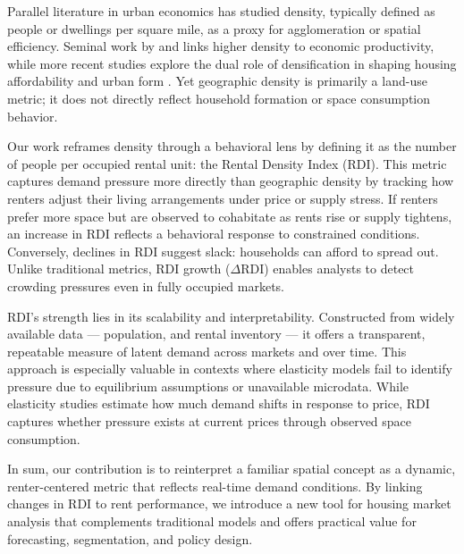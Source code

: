 \documentclass[APA,Times1COL]{WileyNJDv5} %
\begin{document}
Parallel literature in urban economics has studied density, typically defined as people or dwellings per square mile, as a proxy for agglomeration or spatial efficiency. Seminal work by \cite{glaeser2001cities} and \cite{duranton2004micro} links higher density to economic productivity, while more recent studies explore the dual role of densification in shaping housing affordability and urban form \cite{ahlfeldt2019economic, albouy2015driving}. Yet geographic density is primarily a land-use metric; it does not directly reflect household formation or space consumption behavior.

Our work reframes density through a behavioral lens by defining it as the number of people per occupied rental unit: the Rental Density Index (RDI). This metric captures demand pressure more directly than geographic density by tracking how renters adjust their living arrangements under price or supply stress. If renters prefer more space but are observed to cohabitate as rents rise or supply tightens, an increase in RDI reflects a behavioral response to constrained conditions. Conversely, declines in RDI suggest slack: households can afford to spread out. Unlike traditional metrics, RDI growth (\( \Delta \text{RDI} \)) enables analysts to detect crowding pressures even in fully occupied markets.

RDI’s strength lies in its scalability and interpretability. Constructed from widely available data --- population, and rental inventory --- it offers a transparent, repeatable measure of latent demand across markets and over time. This approach is especially valuable in contexts where elasticity models fail to identify pressure due to equilibrium assumptions or unavailable microdata. While elasticity studies estimate how much demand shifts in response to price, RDI captures whether pressure exists at current prices through observed space consumption.

In sum, our contribution is to reinterpret a familiar spatial concept as a dynamic, renter-centered metric that reflects real-time demand conditions. By linking changes in RDI to rent performance, we introduce a new tool for housing market analysis that complements traditional models and offers practical value for forecasting, segmentation, and policy design.
\end{document}
